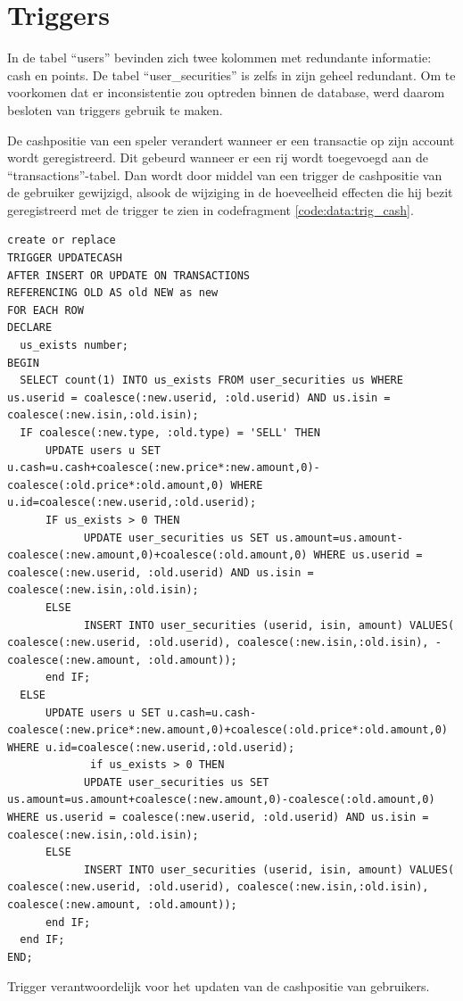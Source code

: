 \section{Triggers}


In de tabel ``users'' bevinden zich twee kolommen met redundante informatie: cash en points. De tabel ``user\_securities'' is zelfs in zijn geheel redundant. Om te voorkomen dat er inconsistentie zou optreden binnen de database, werd daarom besloten van triggers gebruik te maken.

De cashpositie van een speler verandert wanneer er een transactie op zijn account wordt geregistreerd. Dit gebeurd wanneer er een rij wordt toegevoegd aan de ``transactions''-tabel. Dan wordt door middel van een trigger de cashpositie van de gebruiker gewijzigd, alsook de wijziging in de hoeveelheid effecten die hij bezit geregistreerd met de trigger te zien in codefragment \ref{code:data:trig_cash}.

\begin{code}
\begin{lstlisting}
create or replace
TRIGGER UPDATECASH
AFTER INSERT OR UPDATE ON TRANSACTIONS 
REFERENCING OLD AS old NEW as new
FOR EACH ROW 
DECLARE
  us_exists number;
BEGIN
  SELECT count(1) INTO us_exists FROM user_securities us WHERE us.userid = coalesce(:new.userid, :old.userid) AND us.isin = coalesce(:new.isin,:old.isin);
  IF coalesce(:new.type, :old.type) = 'SELL' THEN
      UPDATE users u SET u.cash=u.cash+coalesce(:new.price*:new.amount,0)-coalesce(:old.price*:old.amount,0) WHERE u.id=coalesce(:new.userid,:old.userid);
      IF us_exists > 0 THEN
            UPDATE user_securities us SET us.amount=us.amount-coalesce(:new.amount,0)+coalesce(:old.amount,0) WHERE us.userid = coalesce(:new.userid, :old.userid) AND us.isin = coalesce(:new.isin,:old.isin);
      ELSE
            INSERT INTO user_securities (userid, isin, amount) VALUES( coalesce(:new.userid, :old.userid), coalesce(:new.isin,:old.isin), -coalesce(:new.amount, :old.amount));
      end IF;
  ELSE
      UPDATE users u SET u.cash=u.cash-coalesce(:new.price*:new.amount,0)+coalesce(:old.price*:old.amount,0) WHERE u.id=coalesce(:new.userid,:old.userid);
             if us_exists > 0 THEN
            UPDATE user_securities us SET us.amount=us.amount+coalesce(:new.amount,0)-coalesce(:old.amount,0) WHERE us.userid = coalesce(:new.userid, :old.userid) AND us.isin = coalesce(:new.isin,:old.isin);
      ELSE
            INSERT INTO user_securities (userid, isin, amount) VALUES( coalesce(:new.userid, :old.userid), coalesce(:new.isin,:old.isin), coalesce(:new.amount, :old.amount));
      end IF;
  end IF;
END;
\end{lstlisting}
\caption{Trigger verantwoordelijk voor het updaten van de cashpositie van gebruikers.}
\label{code:data:trig_cash}
\end{code}

